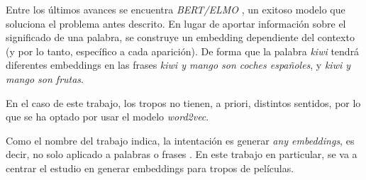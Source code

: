 Entre los últimos avances se encuentra \emph{BERT/ELMO} \cite{bert}, un exitoso modelo que soluciona el
problema antes descrito. En lugar de aportar información sobre el significado de una palabra, se construye
un embedding dependiente del contexto (y por lo tanto, específico a cada aparición). De forma que la palabra
\emph{kiwi} tendrá diferentes embeddings en las frases \emph{kiwi y mango son coches españoles}, y
\emph{kiwi y mango son frutas}.

En el caso de este trabajo, los tropos no tienen, a priori, distintos sentidos, por lo que se ha optado
por usar el modelo \emph{word2vec}.

Como el nombre del trabajo indica, la intentación es generar \textit{any embeddings}, es decir, no solo aplicado a
palabras \cite{word2vec:1} \cite{word2vec:2} o frases \cite{kiros2015skip}. En este trabajo en particular, se va a centrar
el estudio en generar embeddings para tropos de películas.
